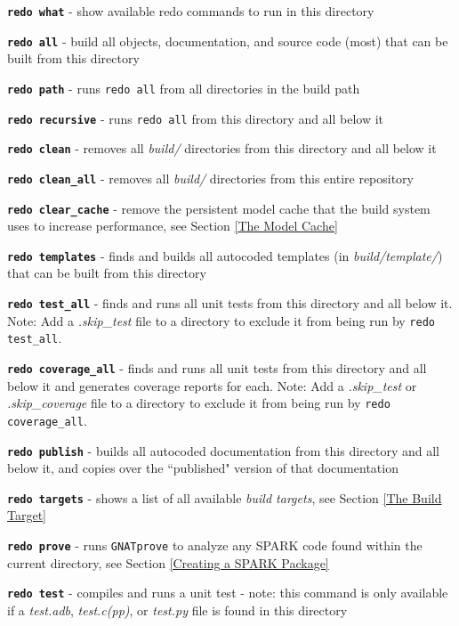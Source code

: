 \begin{spaceditemize}
  \item \textbf{\texttt{redo what}} - show available redo commands to run in this directory
  \item \textbf{\texttt{redo all}} - build all objects, documentation, and source code (most) that can be built from this directory
  \item \textbf{\texttt{redo path}} - runs \texttt{redo all} from all directories in the build path
  \item \textbf{\texttt{redo recursive}} - runs \texttt{redo all} from this directory and all below it
  \item \textbf{\texttt{redo clean}} - removes all \textit{build/} directories from this directory and all below it
  \item \textbf{\texttt{redo clean\_all}} - removes all \textit{build/} directories from this entire repository
  \item \textbf{\texttt{redo clear\_cache}} - remove the persistent model cache that the build system uses to increase performance, see Section \ref{The Model Cache}
  \item \textbf{\texttt{redo templates}} - finds and builds all autocoded templates (in \textit{build/template/}) that can be built from this directory
  \item \textbf{\texttt{redo test\_all}} - finds and runs all unit tests from this directory and all below it. Note: Add a \textit{.skip\_test} file to a directory to exclude it from being run by \texttt{redo test\_all}.
  \item \textbf{\texttt{redo coverage\_all}} - finds and runs all unit tests from this directory and all below it and generates coverage reports for each. Note: Add a \textit{.skip\_test} or \textit{.skip\_coverage} file to a directory to exclude it from being run by \texttt{redo coverage\_all}.
  \item \textbf{\texttt{redo publish}} - builds all autocoded documentation from this directory and all below it, and copies over the ``published" version of that documentation
  \item \textbf{\texttt{redo targets}} - shows a list of all available \textit{build targets}, see Section \ref{The Build Target}
  \item \textbf{\texttt{redo prove}} - runs \texttt{GNATprove} to analyze any SPARK code found within the current directory, see Section \ref{Creating a SPARK Package}
  \item \textbf{\texttt{redo test}} - compiles and runs a unit test - note: this command is only available if a \textit{test.adb}, \textit{test.c(pp)}, or \textit{test.py} file is found in this directory

\end{spaceditemize}
